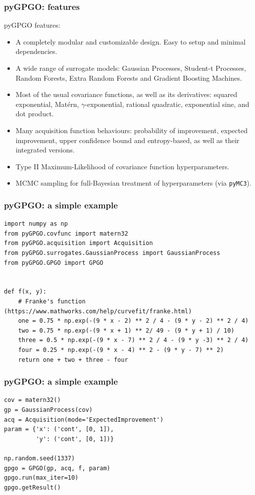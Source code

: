 \documentclass[10pt]{beamer}
\begin{document}
\begin{frame}
\frametitle{pyGPGO: features}
pyGPGO features:
\begin{itemize}
\item A completely modular and customizable design. Easy to setup and minimal dependencies.
\item A wide range of surrogate models: Gaussian Processes, Student-t Processes, Random Forests, Extra Random Forests and Gradient Boosting Machines.
\item Most of the usual covariance functions, as well as its derivatives: squared exponential, Mat\'ern, $\gamma$-exponential, rational quadratic, exponential sine, and dot product.
\item Many acquisition function behaviours: probability of improvement, expected improvement, upper confidence bound and entropy-based, as well as their integrated versions.
\item Type II Maximum-Likelihood of covariance function hyperparameters.
\item MCMC sampling for full-Bayesian treatment of hyperparameters (via \texttt{pyMC3}).
\end{itemize}
\end{frame}

\begin{frame}[fragile]
\frametitle{pyGPGO: a simple example}
\begin{verbatim}
import numpy as np
from pyGPGO.covfunc import matern32
from pyGPGO.acquisition import Acquisition
from pyGPGO.surrogates.GaussianProcess import GaussianProcess
from pyGPGO.GPGO import GPGO


def f(x, y):
    # Franke's function (https://www.mathworks.com/help/curvefit/franke.html)
    one = 0.75 * np.exp(-(9 * x - 2) ** 2 / 4 - (9 * y - 2) ** 2 / 4)
    two = 0.75 * np.exp(-(9 * x + 1) ** 2/ 49 - (9 * y + 1) / 10)
    three = 0.5 * np.exp(-(9 * x - 7) ** 2 / 4 - (9 * y -3) ** 2 / 4)
    four = 0.25 * np.exp(-(9 * x - 4) ** 2 - (9 * y - 7) ** 2)
    return one + two + three - four
\end{verbatim}
\end{frame}

\begin{frame}[fragile]
\frametitle{pyGPGO: a simple example}
\begin{verbatim}
cov = matern32()
gp = GaussianProcess(cov)
acq = Acquisition(mode='ExpectedImprovement')
param = {'x': ('cont', [0, 1]),
         'y': ('cont', [0, 1])}

np.random.seed(1337)
gpgo = GPGO(gp, acq, f, param)
gpgo.run(max_iter=10)
gpgo.getResult()
\end{verbatim}
\end{frame}
\end{document}
